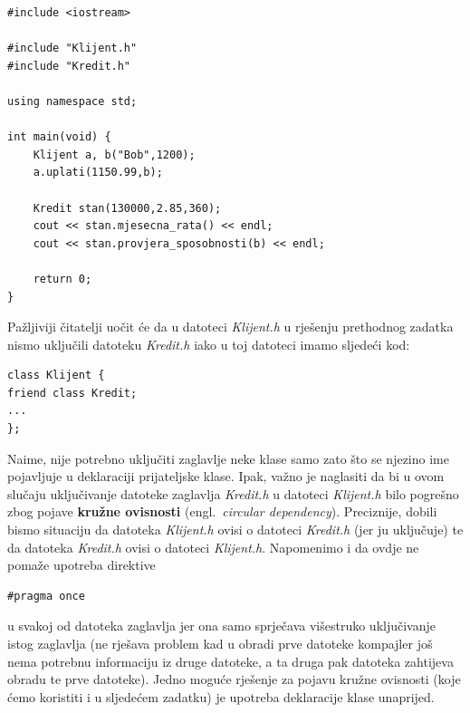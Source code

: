 \begin{rjesenje}
    \begin{verbatim}
#include <iostream>

#include "Klijent.h"
#include "Kredit.h"

using namespace std;

int main(void) {
    Klijent a, b("Bob",1200);
    a.uplati(1150.99,b);
	
    Kredit stan(130000,2.85,360);
    cout << stan.mjesecna_rata() << endl;
    cout << stan.provjera_sposobnosti(b) << endl;
    
    return 0;
}
\end{verbatim}
\end{rjesenje}


Pažljiviji čitatelji uočit će da u datoteci \textit{Klijent.h} u rješenju prethodnog zadatka 
nismo uključili datoteku
\textit{Kredit.h} iako u toj datoteci imamo sljedeći kod:
    \begin{verbatim}
class Klijent {
friend class Kredit;    
...
};
    \end{verbatim}
Naime, nije potrebno uključiti zaglavlje neke klase samo zato što se njezino ime pojavljuje u deklaraciji
prijateljske klase.
Ipak, važno je naglasiti da bi u ovom slučaju 
uključivanje datoteke zaglavlja \textit{Kredit.h}
u datoteci \textit{Klijent.h} bilo pogrešno
zbog pojave \textbf{kružne ovisnosti}
(engl.\ \textit{circular dependency}).
Preciznije,
dobili bismo situaciju da datoteka \textit{Klijent.h}
ovisi o datoteci \textit{Kredit.h}
(jer ju uključuje) te da
datoteka \textit{Kredit.h} ovisi o datoteci \textit{Klijent.h}.
Napomenimo i da ovdje ne pomaže upotreba direktive
\begin{verbatim}
#pragma once
\end{verbatim}
u svakoj od datoteka zaglavlja jer ona samo sprječava višestruko uključivanje istog zaglavlja
(ne rješava problem kad u obradi prve datoteke kompajler još nema potrebnu informaciju iz druge datoteke,
a ta druga pak datoteka zahtijeva obradu te prve datoteke).
Jedno moguće rješenje za pojavu kružne ovisnosti
(koje ćemo koristiti i u sljedećem zadatku)
je upotreba deklaracije klase unaprijed.
\medskip

